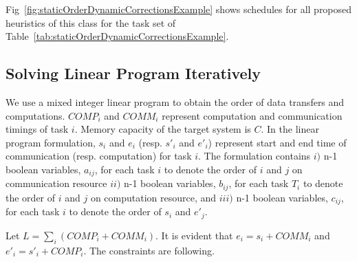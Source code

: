 \documentclass[sigconf]{acmart}
\begin{document}
	
	
	Fig~\ref{fig:staticOrderDynamicCorrectionsExample} shows schedules for all proposed heuristics of this class for the task set of Table~\ref{tab:staticOrderDynamicCorrectionsExample}.
	
	
	
	
	\subsection{Solving Linear Program Iteratively}
	\label{subsec:linearprogrammingformulation}
	We use a mixed integer linear program to obtain the order of data transfers and computations.  $COMP_i$ and $COMM_i$ represent computation and communication timings of task $i$. Memory capacity of the target system is $C$. In the linear program formulation, $s_i$ and $e_i$ (resp. $s'_i$ and $e'_i$) represent start and end time of communication (resp. computation) for task $i$. The formulation contains $i)$ n-1 boolean variables, $a_{ij}$, for each task $i$ to denote the order of $i$ and $j$ on communication resource $ii)$ n-1 boolean variables, $b_{ij}$, for each task $T_i$ to denote the order of $i$ and $j$ on computation resource, and $iii)$ n-1 boolean variables, $c_{ij}$, for each task $i$ to denote the order of $s_i$ and $e'_j$.
	
	
	
	
	
	
	\noindent Let $L=\sum_i (COMP_i + COMM_i)$. It is evident that $e_i =s_i + COMM_i$ and $e'_i =s'_i + COMP_i$. The constraints are following.
	
\end{document}
